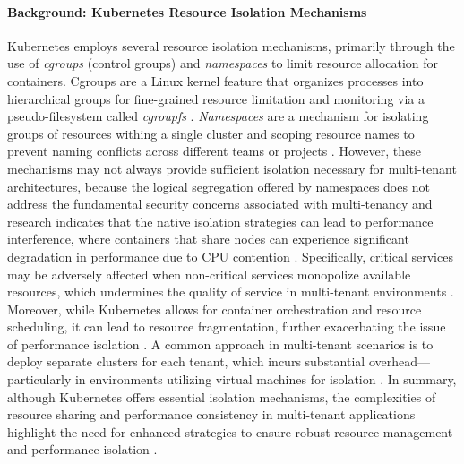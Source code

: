 \documentclass[11pt, a4paper, oneside, draft]{scrartcl}
\begin{document}
            \paragraph{Background: Kubernetes Resource Isolation Mechanisms}
                Kubernetes employs several resource isolation mechanisms, primarily through the use
                of \textit{cgroups} (control groups) and \textit{namespaces} to limit resource
                allocation for containers.
                Cgroups are a Linux kernel feature that organizes processes into hierarchical
                groups for fine-grained resource limitation and monitoring via a pseudo-filesystem
                called \textit{cgroupfs} \parencites{kubernetesCgroupsV2}{cgroups7}.
                \textit{Namespaces} are a mechanism for isolating groups of resources withing a
                single cluster and scoping resource names to prevent naming conflicts across
                different teams or projects \parencite{kubernetesNamespaces}.
                However, these mechanisms may not always provide sufficient isolation necessary for
                multi-tenant architectures, because the logical segregation offered by namespaces
                does not address the fundamental security concerns associated with multi-tenancy 
                \parencite[p.~651]{nguyen2022} and research indicates that the native isolation
                strategies can lead to performance interference, where containers that share nodes
                can experience significant degradation in performance due to CPU contention
                \parencite[p.~158]{kim2021}.
                Specifically, critical services may be adversely affected when non-critical services
                monopolize available resources, which undermines the quality of service in
                multi-tenant environments \parencite[p.~30410]{li2019}.
                \\
                Moreover, while Kubernetes allows for container orchestration and resource
                scheduling, it can lead to resource fragmentation, further exacerbating the issue
                of performance isolation \parencite[p.~1]{jian2023}.
                A common approach in multi-tenant scenarios is to deploy separate clusters for each
                tenant, which incurs substantial overhead—particularly in environments utilizing
                virtual machines for isolation \parencite[pp.~144574--144575]{senel2023}.
                In summary, although Kubernetes offers essential isolation mechanisms, the
                complexities of resource sharing and performance consistency in multi-tenant
                applications highlight the need for enhanced strategies to ensure robust resource
                management and performance isolation
                \parencites[p.~651]{nguyen2022}[p.~2]{jian2023}[p.~158]{kim2021}.
\end{document}
